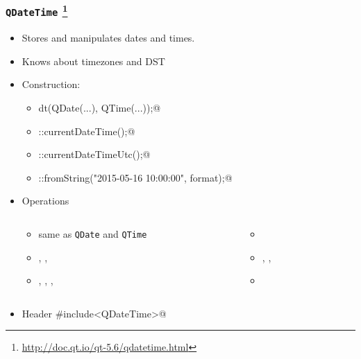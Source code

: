 \begin{frame}[fragile]
  \frametitle{\texttt{QDateTime}
    \footnote{\url{http://doc.qt.io/qt-5.6/qdatetime.html}}}
  \begin{itemize}
    \item Stores and manipulates dates and times.
    \item Knows about timezones and DST
    \item Construction:
    \begin{itemize}
      \footnotesize
      \item \verb@QDateTime dt(QDate(...), QTime(...));@
      \item \verb@QDateTime::currentDateTime();@
      \item \verb@QDateTime::currentDateTimeUtc();@
      \item \verb@QDateTime::fromString("2015-05-16 10:00:00", format);@
    \end{itemize}
    \item Operations
    \begin{columns}
      \scriptsize
      \begin{column}{0.4\textwidth}
      \begin{itemize}
        \item same as \texttt{QDate} and \texttt{QTime}
        \item \verb@setDate@, \verb@setTime@, \verb@setTimeZone@
        \item \verb@date@, \verb@time@, \verb@timeSpec@, \verb@timeZone@
      \end{itemize}
      \end{column}
      \begin{column}{0.4\textwidth}
      \begin{itemize}
        \item \verb@isDaylightTime@
        \item \verb@toUtc@, \verb@toLocalTime@, \verb@toTimeZone@
        \item \verb@toString@
      \end{itemize}
      \end{column}
    \end{columns}
    \item Header \verb@#include<QDateTime>@
  \end{itemize}
\end{frame}

